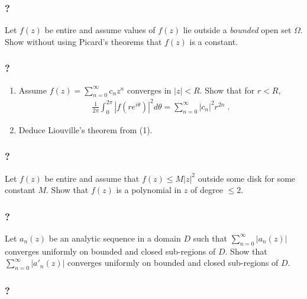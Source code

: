 \hypertarget{section-120}{%
\subsubsection{?}\label{section-120}}

Let \(f(z)\) be entire and assume values of \(f(z)\) lie outside a
\emph{bounded} open set \(\Omega\). Show without using Picard's theorems
that \(f(z)\) is a constant.

\hypertarget{section-121}{%
\subsubsection{?}\label{section-121}}

\begin{enumerate}
\def\labelenumi{(\arabic{enumi})}
\item
  Assume \(\displaystyle f(z) = \sum_{n=0}^\infty c_n z^n\) converges in
  \(|z| < R\). Show that for \(r <R\),
  \begin{align*}\frac{1}{2 \pi} \int_0^{2 \pi} |f(r e^{i \theta})|^2 d \theta
  = \sum_{n=0}^\infty |c_n|^2 r^{2n} \; .\end{align*}
\item
  Deduce Liouville's theorem from (1).
\end{enumerate}

\hypertarget{section-122}{%
\subsubsection{?}\label{section-122}}

Let \(f(z)\) be entire and assume that \(f(z) \leq M |z|^2\) outside
some disk for some constant \(M\). Show that \(f(z)\) is a polynomial in
\(z\) of degree \(\leq 2\).

\hypertarget{section-123}{%
\subsubsection{?}\label{section-123}}

Let \(a_n(z)\) be an analytic sequence in a domain \(D\) such that
\(\displaystyle \sum_{n=0}^\infty |a_n(z)|\) converges uniformly on
bounded and closed sub-regions of \(D\). Show that
\(\displaystyle \sum_{n=0}^\infty |a'_n(z)|\) converges uniformly on
bounded and closed sub-regions of \(D\).

\hypertarget{section-124}{%
\subsubsection{?}\label{section-124}}


